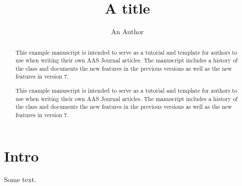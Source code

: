 \documentclass[linenumbers]{aastex701}
\begin{document}
\title{A title}
\author{An Author}
\begin{abstract}
This example manuscript is intended to serve as a tutorial and template for authors to use when writing their own AAS Journal articles. The manuscript includes a history of the class and documents the new features in the previous versions as well as the new features in version 7.

This example manuscript is intended to serve as a tutorial and template for authors to use when writing their own AAS Journal articles. The manuscript includes a history of the class and documents the new features in the previous versions as well as the new features in version 7.

\end{abstract}
\section{Intro}
Some text.
\end{document}
